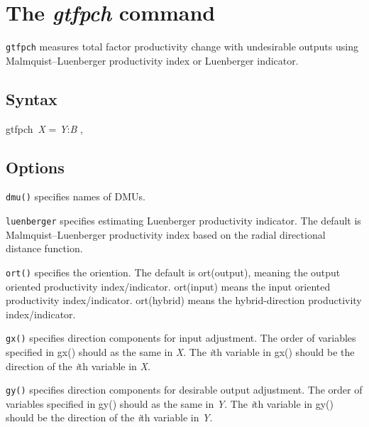 \section{The \textit{gtfpch} command}\label{sec_gtfpch}
{\tt gtfpch} measures total factor productivity change with undesirable outputs using Malmquist–Luenberger productivity index or Luenberger indicator.

\subsection{Syntax}
\begin{stsyntax}
	gtfpch\
	\textit{X\varlist} = \textit{Y\varlist}:\textit{B\varlist} \optif \optin,\
\end{stsyntax}


\subsection{Options}

\hangpara
{\tt dmu(\varname)} specifies names of DMUs. 

\hangpara
{\tt luenberger} specifies estimating Luenberger productivity indicator. The default is Malmquist–Luenberger productivity index based on the radial directional distance function.

\hangpara
{\tt ort(\ststring)} specifies the oriention. The default is ort(output), meaning the output oriented productivity index/indicator. ort(input) means the input oriented productivity index/indicator. ort(hybrid) means the hybrid-direction productivity index/indicator.

\hangpara
{\tt gx(\varlist)} specifies direction components for input adjustment. The order of variables specified in gx() should as the same in \textit{X\varlist}. The \textit{i}th variable in gx() should be the direction of the \textit{i}th variable in \textit{X\varlist}.

\hangpara
{\tt gy(\varlist)} specifies direction components for desirable output adjustment. The order of variables specified in gy() should as the same in \textit{Y\varlist}. The \textit{i}th variable in gy() should be the direction of the \textit{i}th variable in \textit{Y\varlist}.

